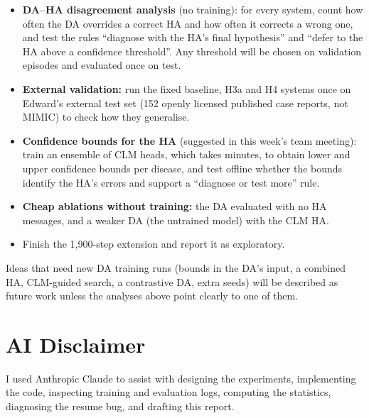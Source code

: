 \documentclass[11pt]{article}
\begin{document}
\begin{itemize}
  \item \textbf{DA--HA disagreement analysis} (no training): for every system,
        count how often the DA overrides a correct HA and how often it corrects
        a wrong one, and test the rules ``diagnose with the HA's final
        hypothesis'' and ``defer to the HA above a confidence threshold''. Any
        threshold will be chosen on validation episodes and evaluated once on
        test.
  \item \textbf{External validation:} run the fixed baseline, H3a and H4
        systems once on Edward's external test set (152 openly licensed
        published case reports, not MIMIC) to check how they generalise.
  \item \textbf{Confidence bounds for the HA} (suggested in this week's team
        meeting):
        train an ensemble of CLM heads, which takes minutes, to obtain lower
        and upper confidence bounds per disease, and test offline whether the
        bounds identify the HA's errors and support a ``diagnose or test more''
        rule.
  \item \textbf{Cheap ablations without training:} the DA evaluated with no HA
        messages, and a weaker DA (the untrained model) with the CLM HA.
  \item Finish the 1,900-step extension and report it as exploratory.
\end{itemize}

Ideas that need new DA training runs (bounds in the DA's input, a combined HA,
CLM-guided search, a contrastive DA, extra seeds) will be described as future
work unless the analyses above point clearly to one of them.

\section{AI Disclaimer}

I used Anthropic Claude to assist with designing the experiments, implementing
the code, inspecting training and evaluation logs, computing the statistics,
diagnosing the resume bug, and drafting this report.
\end{document}
